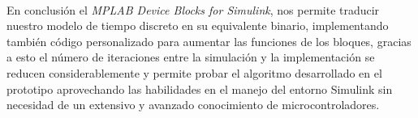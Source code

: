 En conclusi\'{o}n el \textit{MPLAB\textsuperscript{\textregistered} Device Blocks for Simulink\textsuperscript{\textregistered}}, nos permite traducir nuestro modelo de tiempo discreto en su equivalente binario, implementando tambi\'{e}n c\'{o}digo personalizado para aumentar las funciones de los bloques, gracias a esto el n\'{u}mero de iteraciones entre la simulaci\'{o}n y la implementaci\'{o}n se reducen considerablemente y permite probar el algoritmo desarrollado en el prototipo aprovechando las habilidades en el manejo del entorno Simulink sin necesidad de un extensivo y avanzado conocimiento de microcontroladores.






